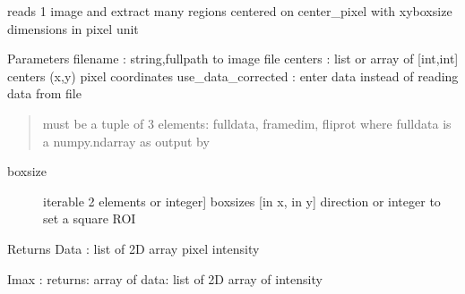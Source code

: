 \documentclass[letterpaper,10pt,english]{sphinxmanual}
\begin{document}

\begin{fulllineitems}
\label{\detokenize{PeakSearch:LaueTools.readmccd.readoneimage_manycrops}}
reads 1 image and extract many regions
centered on center\_pixel with xyboxsize dimensions in pixel unit

Parameters
filename : string,fullpath to image file
centers : list or array of {[}int,int{]} centers (x,y) pixel coordinates
use\_data\_corrected : enter data instead of reading data from file
\begin{quote}

must be a tuple of 3 elements:
fulldata, framedim, fliprot
where fulldata is a numpy.ndarray
as output by {\hyperref[\detokenize{PeakSearch:LaueTools.readmccd.readCCDimage}]{}}
\end{quote}
\begin{description}
\item[{boxsize}] \leavevmode{[}iterable 2 elements or integer{]}
boxsizes {[}in x, in y{]} direction or integer to set a square ROI

\end{description}

Returns
Data : list of 2D array pixel intensity

Imax :
returns:
array of data: list of 2D array of intensity

\end{fulllineitems}

\end{document}
